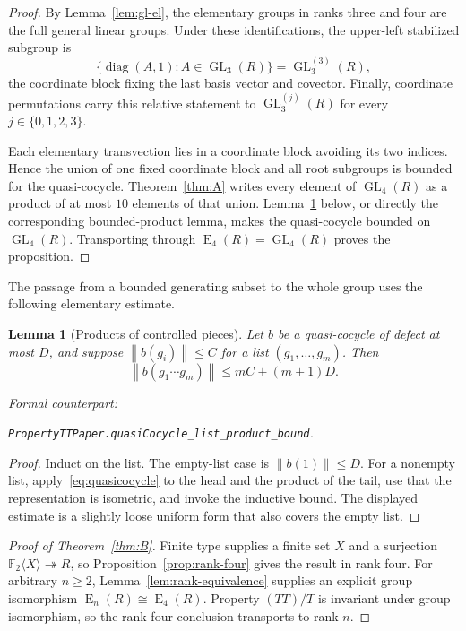 \documentclass[11pt]{amsart}
\newif\ifanonymous\anonymoustrue
\newcommand{\leanrepo}{[repository link removed for anonymous review]}
\newcommand{\leanrepo}{https://github.com/SauersML/group-approximation}
\newcommand{\leanverified}[2]{%
  \par\smallskip\noindent
  {\normalfont\footnotesize\color{gray!70!black}%
  Formal counterpart:\par\nobreak\noindent
  \ifanonymous\nolinkurl{#2}\else
  \href{\leanrepo/blob/main/GroupApproximation/#1.lean}{\nolinkurl{#2}}\fi.}}
\newtheorem{lemma}[theorem]{Lemma}
\theoremstyle{definition}
\theoremstyle{plain}
\newcommand{\F}{\mathbb F}
\newcommand{\GL}{\operatorname{GL}}
\newcommand{\EL}{\operatorname{E}}
\newcommand{\diag}{\operatorname{diag}}
\newcommand{\norm}[1]{\left\lVert#1\right\rVert}
\begin{document}
\begin{proof}
By Lemma~\ref{lem:gl-el}, the elementary groups in ranks three and
four are the full general linear groups.  Under these identifications,
the upper-left stabilized subgroup is
\[
 \{\diag(A,1):A\in\GL_3(R)\}=\GL_3^{(3)}(R),
\]
the coordinate block fixing the last basis vector and covector.
Finally, coordinate permutations carry this
relative statement to \(\GL_3^{(j)}(R)\) for every
\(j\in\{0,1,2,3\}\).

Each elementary transvection lies in a coordinate block avoiding its
two indices.  Hence the union of one fixed coordinate block and all
root subgroups is bounded for the quasi-cocycle.  Theorem~\ref{thm:A}
writes every element of \(\GL_4(R)\) as a product of at most \(10\)
elements of that union.  Lemma~\ref{lem:products} below, or directly
the corresponding bounded-product lemma, makes the quasi-cocycle
bounded on \(\GL_4(R)\).  Transporting through
\(\EL_4(R)=\GL_4(R)\) proves the proposition.
\end{proof}

The passage from a bounded generating subset to the whole group
uses the following elementary estimate.

\begin{lemma}[Products of controlled pieces]\label{lem:products}
Let \(b\) be a quasi-cocycle of defect at most \(D\), and suppose
\(\norm{b(g_i)}\le C\) for a list \((g_1,\ldots,g_m)\).  Then
\[
  \norm{b(g_1\cdots g_m)}
  \le mC+(m+1)D.
\]
\leanverified{PropertyTT/PaperStatements}{PropertyTTPaper.quasiCocycle_list_product_bound}
\end{lemma}

\begin{proof}
Induct on the list.  The empty-list case is
\(\norm{b(1)}\le D\).  For a nonempty list, apply~\eqref{eq:quasicocycle}
to the head and the product of the tail, use
that the representation is isometric, and invoke the inductive
bound.  The displayed estimate is a slightly loose uniform form that
also covers the empty list.
\end{proof}

\begin{proof}[Proof of Theorem~\ref{thm:B}]
Finite type supplies a finite set \(X\) and a surjection
\(\F_2\langle X\rangle\twoheadrightarrow R\), so
Proposition~\ref{prop:rank-four} gives the result in rank four.  For
arbitrary \(n\ge2\), Lemma~\ref{lem:rank-equivalence} supplies an
explicit group isomorphism \(\EL_n(R)\cong\EL_4(R)\).
Property \((TT)/T\) is invariant under group isomorphism, so the
rank-four conclusion transports to rank \(n\).
\end{proof}
\end{document}

